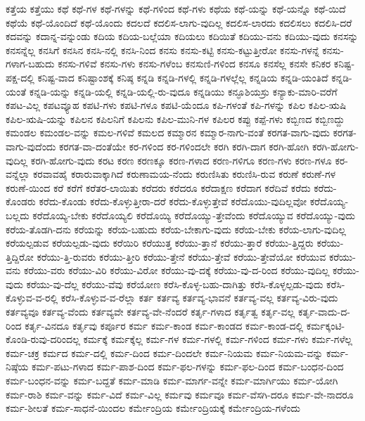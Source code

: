 {ಕತ್ತೆಯ
ಕತ್ತೆಯು
ಕಥೆ
ಕಥೆ-ಗಳ
ಕಥೆ-ಗಳನ್ನು
ಕಥೆ-ಗಳಿಂದ
ಕಥೆ-ಗಳು
ಕಥೆಯ
ಕಥೆ-ಯನ್ನು
ಕಥೆ-ಯನ್ನೊ
ಕಥೆ-ಯಿದೆ
ಕಥೆಯೆ
ಕಥೆ-ಯೊಂದಿದೆ
ಕಥೆ-ಯೊಂದು
ಕದಲದೆ
ಕದಲಿಸ-ಲಾಗು-ವುದಿಲ್ಲ
ಕದಲಿಸ-ಲಾರದು
ಕದಲಿಸಲು
ಕದಲಿಸಿ-ದರೆ
ಕದವನ್ನು
ಕದಾನ್ನ-ವನ್ನುಂಡು
ಕದಿಯ
ಕದಿಯ-ಬಲ್ಲೆಯಾ
ಕದಿಯಲು
ಕದಿಯಿತೆ
ಕದಿಯು-ವನು
ಕದಿಯು-ವುದು
ಕನಸನ್ನು
ಕನಸನ್ನೆಲ್ಲ
ಕನಸಿಗೆ
ಕನಸಿನ
ಕನಸಿ-ನಲ್ಲಿ
ಕನಸಿ-ನಿಂದ
ಕನಸು
ಕನಸು-ಕಟ್ಟಿ
ಕನಸು-ಕಟ್ಟುತ್ತೀರೋ
ಕನಸು-ಗಳನ್ನೆ
ಕನಸು-ಗಳಾಗ-ಬಹುದು
ಕನಸು-ಗಳಿವೆ
ಕನಸು-ಗಳು
ಕನಸು-ಗಳೆಂಬ
ಕನಸುಣಿ-ಗಳಿಂದ
ಕನಸೂ
ಕನಸೆಲ್ಲ
ಕನಸೇ
ಕನಿಕರ
ಕನಿಷ್ಟ-ಪಕ್ಷ-ದಲ್ಲಿ
ಕನಿಷ್ಟ-ವಾದ
ಕನಿಷ್ಟಾಂಶಕ್ಕೆ
ಕನಿಷ್ಠ
ಕನ್ನಡಿ
ಕನ್ನಡಿ-ಗಳಲ್ಲಿ
ಕನ್ನಡಿ-ಗಳಲ್ಲೆಲ್ಲ
ಕನ್ನಡಿಯ
ಕನ್ನಡಿ-ಯಂತಿದೆ
ಕನ್ನಡಿ-ಯಂತೆ
ಕನ್ನಡಿ-ಯನ್ನು
ಕನ್ನಡಿ-ಯಲ್ಲಿ
ಕನ್ನಡಿ-ಯಲ್ಲಿ-ರು-ವುದೂ
ಕನ್ನಡಿಯು
ಕನ್ಫೂಶಿಯಸ್ರು
ಕನ್ಯಾಕು-ಮಾರಿ-ವರೆಗೆ
ಕಪಟ-ವಿಲ್ಲ
ಕಪಟವ್ಯೂಹ
ಕಪಟಿ-ಗಳು
ಕಪಟಿ-ಗಳೂ
ಕಪಟಿ-ಯೆಂದೂ
ಕಪಿ-ಗಳಂತೆ
ಕಪಿ-ಗಳನ್ನು
ಕಪಿಲ
ಕಪಿಲ-ಋಷಿ
ಕಪಿಲ-ಋಷಿ-ಯನ್ನು
ಕಪಿಲನ
ಕಪಿಲನಿಗೆ
ಕಪಿಲನು
ಕಪಿಲ-ಮುನಿ-ಗಳ
ಕಪಿಲರ
ಕಪ್ಪು
ಕಪ್ಪೆ-ಗಳು
ಕಬ್ಬಿಣದ
ಕಬ್ಬಿಣದ್ದು
ಕಮಂಡಲ
ಕಮಂಡಲ-ವನ್ನು
ಕಮಲ-ಗಳಿವೆ
ಕಮಲದ
ಕಮ್ಮಾರನ
ಕಮ್ಮಾರ-ನಾಗು-ವಂತೆ
ಕರಗತ-ವಾಗು-ವುದು
ಕರಗತ-ವಾಗು-ವುದೆಂದು
ಕರಗತ-ವಾ-ದಂತೆಯೇ
ಕರ-ಗಳಿಂದ
ಕರ-ಗಳಿಂದಲೇ
ಕರಗಿ
ಕರಗಿ-ದಾಗ
ಕರಗಿ-ಹೋಗಿ
ಕರಗಿ-ಹೋಗು-ವುದಿಲ್ಲ
ಕರಗಿ-ಹೋಗು-ವುದು
ಕರಟ
ಕರಣ
ಕರಣಕ್ಕೂ
ಕರಣ-ಗಳಾದ
ಕರಣ-ಗಳಿಗೂ
ಕರಣ-ಗಳು
ಕರಣ-ಗಳೂ
ಕರ-ವನ್ನೆಲ್ಲಾ
ಕರವಾವಹೈ
ಕರಾರುವಾಕ್ಕಾಗಿದೆ
ಕರುಣಾಮಯ-ನೆಂದು
ಕರುಣಿಸಿತು
ಕರುಣಿಸಿ-ರುವ
ಕರುಣೆ
ಕರುಣೆ-ಗಳ
ಕರುಣೆ-ಯಿಂದ
ಕರೆ
ಕರೆಗೆ
ಕರೆತರ-ಲಾಯಿತು
ಕರೆದರು
ಕರೆದರೂ
ಕರೆದಾಕ್ಷಣ
ಕರೆದಾಗ
ಕರೆದಿವೆ
ಕರೆದು
ಕರೆದು-ಕೊಂಡರು
ಕರೆದು-ಕೊಂಡು
ಕರೆದು-ಕೊಳ್ಳುತ್ತೀರಾ-ದರೆ
ಕರೆದು-ಕೊಳ್ಳುತ್ತೇವೆ
ಕರೆದೊಯು-ವುದಿಲ್ಲವೋ
ಕರೆದೊಯ್ಯ-ಬಲ್ಲದು
ಕರೆದೊಯ್ಯ-ಬೇಕು
ಕರೆದೊಯ್ಯಲಿ
ಕರೆದೊಯ್ಯಿ
ಕರೆದೊಯ್ಯು-ತ್ತೇವೆಂದು
ಕರೆದೊಯ್ಯುವ
ಕರೆದೊಯ್ಯು-ವುದು
ಕರೆಯ-ತೊಡಗಿ-ದನು
ಕರೆಯನ್ನು
ಕರೆಯ-ಬಹುದು
ಕರೆಯ-ಬೇಕಾಗು-ವುದು
ಕರೆಯ-ಬೇಕು
ಕರೆಯ-ಲಾಗು-ವುದಿಲ್ಲ
ಕರೆಯಲ್ಪಡುವ
ಕರೆಯಲ್ಪಡು-ವುದು
ಕರೆಯಿರಿ
ಕರೆಯುತ್ತ
ಕರೆಯು-ತ್ತಾನೆ
ಕರೆಯು-ತ್ತಾರೆ
ಕರೆಯು-ತ್ತಿದ್ದರು
ಕರೆಯು-ತ್ತಿದ್ದಿರೋ
ಕರೆಯು-ತ್ತಿ-ರುವರು
ಕರೆಯು-ತ್ತೀರಿ
ಕರೆಯು-ತ್ತೇನೆ
ಕರೆಯು-ತ್ತೇವೆ
ಕರೆಯು-ತ್ತೇವೆಯೋ
ಕರೆಯುವ
ಕರೆಯು-ವನು
ಕರೆಯು-ವರು
ಕರೆಯು-ವಿರಿ
ಕರೆಯು-ವಿರೋ
ಕರೆಯು-ವು-ದಕ್ಕೆ
ಕರೆಯು-ವು-ದ-ರಿಂದ
ಕರೆಯು-ವುದಿಲ್ಲ
ಕರೆಯು-ವುದು
ಕರೆಯು-ವು-ದೆಲ್ಲ
ಕರೆಯು-ವೆವು
ಕರೆಯೋಣ
ಕರೆಸಿ-ಕೊಳ್ಳ-ಬಹು-ದಾಗಿತ್ತು
ಕರೆಸಿ-ಕೊಳ್ಳಲ್ಪಡು-ವುದು
ಕರೆಸಿ-ಕೊಳ್ಳುವ-ವ-ರಲ್ಲಿ
ಕರೆಸಿ-ಕೊಳ್ಳುವ-ವ-ರೆಲ್ಲಾ
ಕರ್ತ
ಕರ್ತವ್ಯ
ಕರ್ತವ್ಯ-ಭಾವನೆ
ಕರ್ತವ್ಯ-ವಲ್ಲ
ಕರ್ತವ್ಯ-ವಿರು-ವುದು
ಕರ್ತವ್ಯವೂ
ಕರ್ತವ್ಯ-ವೆಂದು
ಕರ್ತವ್ಯವೇ
ಕರ್ತವ್ಯ-ವೇ-ನೆಂದರೆ
ಕರ್ತೃ-ಗಳಾದ
ಕರ್ತೃತ್ವ
ಕರ್ತೃ-ವಲ್ಲ
ಕರ್ತೃ-ವಾದು-ದ-ರಿಂದ
ಕರ್ತೃ-ವಿನದೂ
ಕರ್ತೃವು
ಕರ್ಪೂರ
ಕರ್ಮ
ಕರ್ಮ-ಕಾಂಡ
ಕರ್ಮ-ಕಾಂಡದ
ಕರ್ಮ-ಕಾಂಡ-ದಲ್ಲಿ
ಕರ್ಮಕ್ಕಂಟಿ-ಕೊಂಡಿ-ರುವು-ದರಿಂದಲ್ಲ
ಕರ್ಮಕ್ಕೆ
ಕರ್ಮಕ್ಕೆಲ್ಲ
ಕರ್ಮ-ಗಳ
ಕರ್ಮ-ಗಳಲ್ಲಿ
ಕರ್ಮ-ಗಳಿಂದ
ಕರ್ಮ-ಗಳು
ಕರ್ಮ-ಗಳೆಲ್ಲ
ಕರ್ಮ-ಚಕ್ರ
ಕರ್ಮದ
ಕರ್ಮ-ದಲ್ಲಿ
ಕರ್ಮ-ದಿಂದ
ಕರ್ಮ-ದಿಂದಲೇ
ಕರ್ಮ-ನಿಯಮ
ಕರ್ಮ-ನಿಯಮ-ವನ್ನು
ಕರ್ಮ-ನಿಷ್ಠೆಯ
ಕರ್ಮ-ಪಟು-ಗಳಾದ
ಕರ್ಮ-ಪಾಶ-ದಿಂದ
ಕರ್ಮ-ಫಲ-ಗಳನ್ನು
ಕರ್ಮ-ಫಲ-ದಿಂದ
ಕರ್ಮ-ಬಂಧನ-ದಿಂದ
ಕರ್ಮ-ಬಂಧನ-ವನ್ನು
ಕರ್ಮ-ಬದ್ದತೆ
ಕರ್ಮ-ಮಾಡಿ
ಕರ್ಮ-ಮಾರ್ಗ-ವನ್ನೇ
ಕರ್ಮ-ಮಾರ್ಗಿಯು
ಕರ್ಮ-ಯೋಗಿ
ಕರ್ಮ-ರಾಶಿ
ಕರ್ಮ-ವನ್ನು
ಕರ್ಮ-ವಿದೆ
ಕರ್ಮ-ವಿಲ್ಲ
ಕರ್ಮವು
ಕರ್ಮವೂ
ಕರ್ಮ-ವೆಸಗಿ-ದರೂ
ಕರ್ಮ-ವೇ-ನಾದರೂ
ಕರ್ಮ-ಶೀಲತೆ
ಕರ್ಮ-ಸಾಧನೆ-ಯಿಂದಲ
ಕರ್ಮೇಂದ್ರಿಯ
ಕರ್ಮೇಂದ್ರಿಯಕ್ಕೆ
ಕರ್ಮೇಂದ್ರಿಯ-ಗಳೆಂದು
}
